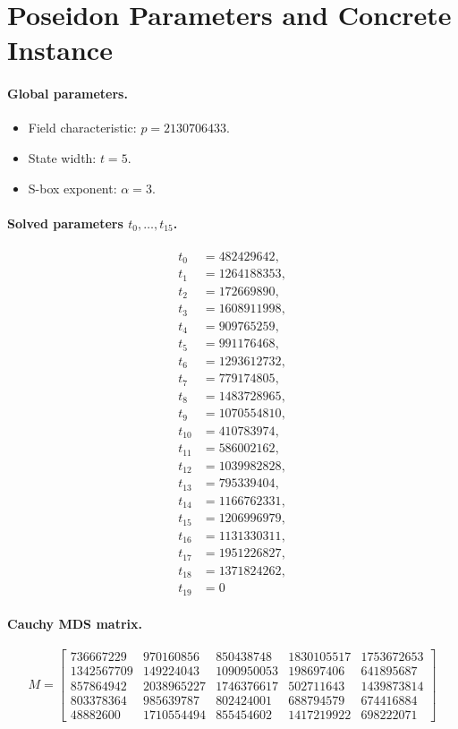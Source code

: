 \section*{Poseidon Parameters and Concrete Instance}

\paragraph{Global parameters.}
\begin{itemize}
  \item Field characteristic: $p = 2130706433$.
  \item State width: $t = 5$.
  \item S-box exponent: $\alpha = 3$.
\end{itemize}

\paragraph{Solved parameters $t_0,\dots,t_{15}$.}
\begin{align*}
t_0 &= 482429642, \\
t_1 &= 1264188353, \\
t_2 &= 172669890, \\
t_3 &= 1608911998, \\
t_4 &= 909765259, \\
t_5 &= 991176468, \\
t_6 &= 1293612732, \\
t_7 &= 779174805, \\
t_8 &= 1483728965, \\
t_9 &= 1070554810, \\
t_10 &= 410783974, \\
t_11 &= 586002162, \\
t_12 &= 1039982828, \\
t_13 &= 795339404, \\
t_14 &= 1166762331, \\
t_15 &= 1206996979, \\
t_16 &= 1131330311, \\
t_17 &= 1951226827, \\
t_18 &= 1371824262, \\
t_19 &= 0
\end{align*}

\paragraph{Cauchy MDS matrix.}
\[
M = \begin{bmatrix}736667229 & 970160856 & 850438748 & 1830105517 & 1753672653 \\ 1342567709 & 149224043 & 1090950053 & 198697406 & 641895687 \\ 857864942 & 2038965227 & 1746376617 & 502711643 & 1439873814 \\ 803378364 & 985639787 & 802424001 & 688794579 & 674416884 \\ 48882600 & 1710554494 & 855454602 & 1417219922 & 698222071\end{bmatrix}
\]

